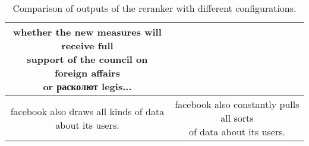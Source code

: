 \begin{table}
\begin{tabular}{||c|c||}
	\parbox{7cm}{\vspace{.5\baselineskip} whether the new measures will receive full\\support of the council on foreign affairs\\or расколют legis...\vspace{.5\baselineskip}}\\
	\hline
	\parbox{7cm}{\vspace{.5\baselineskip} facebook also draws all kinds of data\\about its users. \vspace{.5\baselineskip}}&
	\parbox{7cm}{\vspace{.5\baselineskip} facebook also constantly pulls all sorts\\of data about its users.\vspace{.5\baselineskip}}\\
	\hline
	\end{tabular}
	\caption{Comparison of outputs of the reranker with different configurations.}\label{translation_compare}
\end{table}
